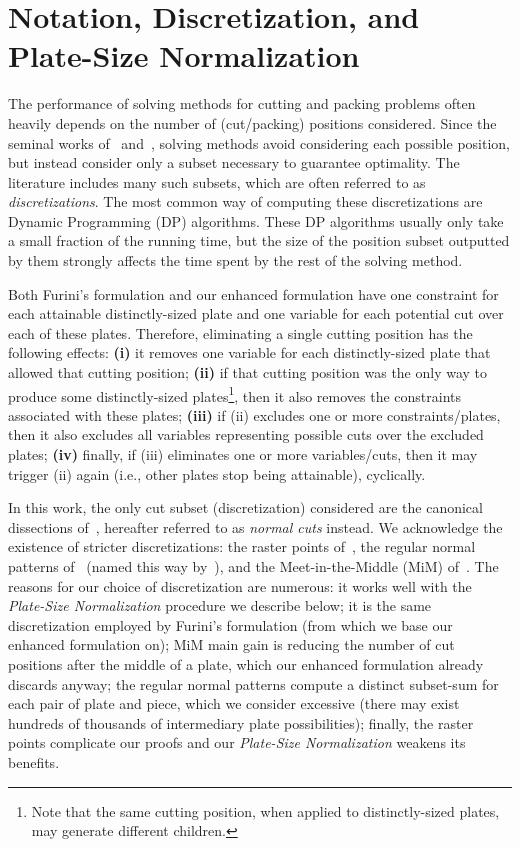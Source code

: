 \documentclass[ppgc,prop-tese,english,formais,babel]{iiufrgs}
\begin{document}
\chapter{Notation, Discretization, and Plate-Size Normalization}
\label{sec:psn}

The performance of solving methods for cutting and packing problems often heavily depends on the number of (cut/packing) positions considered.
Since the seminal works of~\citet{cw:1977} and~\citet{herz:1972}, solving methods avoid considering each possible position, but instead consider only a subset necessary to guarantee optimality.
The literature includes many such subsets, which are often referred to as \emph{discretizations}.
The most common way of computing these discretizations are Dynamic Programming (DP) algorithms.
These DP algorithms usually only take a small fraction of the running time, but the size of the position subset outputted by them strongly affects the time spent by the rest of the solving method.

Both Furini's formulation and our enhanced formulation have one constraint for each attainable distinctly-sized plate and one variable for each potential cut over each of these plates.
Therefore, eliminating a single cutting position has the following effects:
\textbf{(i)} it removes one variable for each distinctly-sized plate that allowed that cutting position;
\textbf{(ii)} if that cutting position was the only way to produce some distinctly-sized plates\footnote{Note that the same cutting position, when applied to distinctly-sized plates, may generate different children.}, then it also removes the constraints associated with these plates;
\textbf{(iii)} if (ii) excludes one or more constraints/plates, then it also excludes all variables representing possible cuts over the excluded plates;
\textbf{(iv)} finally, if (iii) eliminates one or more variables/cuts, then it may trigger (ii) again (i.e., other plates stop being attainable), cyclically.

In this work, the only cut subset (discretization) considered are the canonical dissections of~\citet{herz:1972}, hereafter referred to as \emph{normal cuts} instead.
We acknowledge the existence of stricter discretizations: the raster points of~\citet{terno:1987,guntram:1966}, the regular normal patterns of~\citet{boschetti:2002} (named this way by~\citet{cote:2018}), and the Meet-in-the-Middle (MiM) of~\citet{cote:2018}.
The reasons for our choice of discretization are numerous:
it works well with the \emph{Plate-Size Normalization} procedure we describe below;
it is the same discretization employed by Furini's formulation (from which we base our enhanced formulation on);
MiM main gain is reducing the number of cut positions after the middle of a plate, which our enhanced formulation already discards anyway;
the regular normal patterns compute a distinct subset-sum for each pair of plate and piece, which we consider excessive (there may exist hundreds of thousands of intermediary plate possibilities);
finally, the raster points complicate our proofs and our \emph{Plate-Size Normalization} weakens its benefits.
\end{document}
